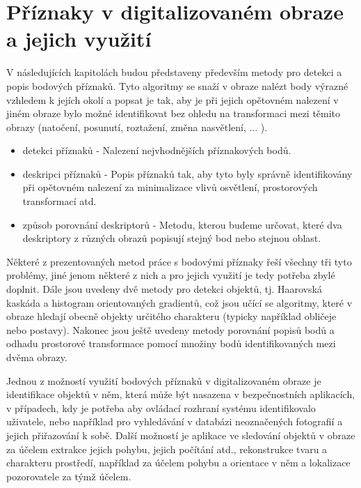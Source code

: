 
\chapter{Příznaky v digitalizovaném obraze a jejich využití}
\label{chap:slam}

V následujících kapitolách budou představeny především metody pro detekci a popis bodových příznaků. Tyto algoritmy se snaží v obraze nalézt body výrazné vzhledem k jejích okolí a popsat je tak, aby je při jejich opětovném nalezení v jiném obraze bylo možné identifikovat bez ohledu na transformaci mezi těmito obrazy (natočení, posunutí, roztažení, změna nasvětlení, ... ). %


\begin{itemize}
	\item{detekci příznaků} - Nalezení nejvhodnějších příznakových bodů.
	\item{deskripci příznaků} - Popis příznaků tak, aby tyto byly správně identifikovány při opětovném nalezení za minimalizace vlivů osvětlení, prostorových transformací atd.
	\item{způsob porovnání deskriptorů} - Metodu, kterou budeme určovat, které dva deskriptory z různých obrazů popisují stejný bod nebo stejnou oblast.
\end{itemize} 

Některé z prezentovaných metod práce s bodovými příznaky řeší všechny tři tyto problémy, jiné jenom některé z nich a pro jejich využití je tedy potřeba zbylé doplnit. Dále jsou uvedeny dvě metody pro detekci objektů, tj. Haarovská kaskáda a histogram orientovaných gradientů, což jsou učící se algoritmy, které v obraze hledají obecně objekty určitého charakteru (typicky například obličeje nebo postavy). Nakonec jsou ještě uvedeny metody porovnání popisů bodů a odhadu prostorové transformace pomocí množiny bodů identifikovaných mezi dvěma obrazy. 

Jednou z možností využití bodových příznaků v digitalizovaném obraze je identifikace objektů v něm, která může být nasazena v bezpečnostních aplikacích, v případech, kdy je potřeba aby ovládací rozhraní systému identifikovalo uživatele, nebo například pro vyhledávání v databázi neoznačených fotografií a jejich přiřazování k sobě. Další možností je aplikace ve sledování objektů v obraze za účelem extrakce jejich pohybu, jejich počítání atd., rekonstrukce tvaru a charakteru prostředí, například za účelem pohybu a orientace v něm a lokalizace pozorovatele za týmž účelem. 

